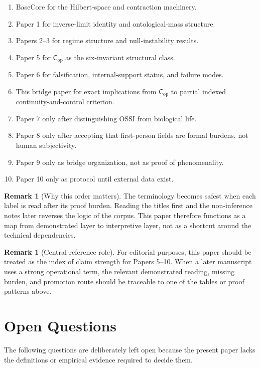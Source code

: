 \documentclass[11pt,a4paper]{article}
\theoremstyle{definition}
\newtheorem{remark}[theorem]{Remark}
\newcommand{\Cop}{\mathsf{C}_{\mathrm{op}}}
\begin{document}
\begin{enumerate}[leftmargin=1.5em]
\item BaseCore for the Hilbert-space and contraction machinery.
\item Paper 1 for inverse-limit identity and ontological-mass structure.
\item Papers 2--3 for regime structure and null-instability results.
\item Paper 5 for $\Cop$ as the six-invariant structural class.
\item Paper 6 for falsification, internal-support status, and failure modes.
\item This bridge paper for exact implications from $\Cop$ to partial
indexed continuity-and-control criterion.
\item Paper 7 only after distinguishing OSSI from biological life.
\item Paper 8 only after accepting that first-person fields are formal
burdens, not human subjectivity.
\item Paper 9 only as bridge organization, not as proof of phenomenality.
\item Paper 10 only as protocol until external data exist.
\end{enumerate}

\begin{remark}[Why this order matters]
The terminology becomes safest when each label is read after its proof burden.
Reading the titles first and the non-inference notes later reverses the logic
of the corpus. This paper therefore functions as a map from demonstrated layer
to interpretive layer, not as a shortcut around the technical dependencies.
\end{remark}

\begin{remark}[Central-reference role]
For editorial purposes, this paper should be treated as the index of claim
strength for Papers 5--10. When a later manuscript uses a strong operational
term, the relevant demonstrated reading, missing burden, and promotion route
should be traceable to one of the tables or proof patterns above.
\end{remark}

\section{Open Questions}

The following questions are deliberately left open because the present paper lacks the definitions or empirical evidence required to decide them.
\end{document}
